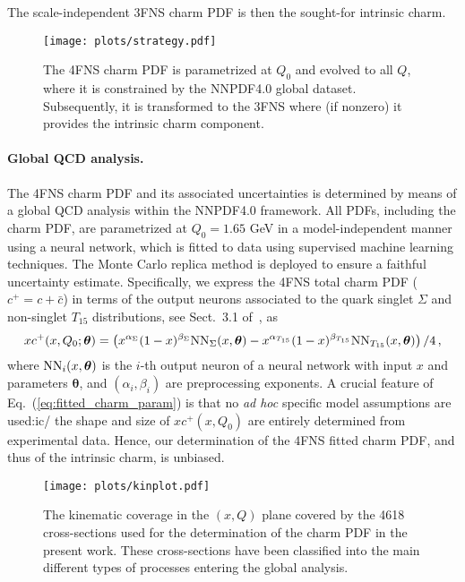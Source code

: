 \documentclass[11pt,a4paper]{article}
\newcommand{\be}{\begin{equation}}
\newcommand{\ee}{\end{equation}}
\newcommand{\lp}{\left(}
\newcommand{\rp}{\right)}
\begin{document}
The scale-independent 3FNS charm PDF is then the sought-for intrinsic
charm.

\begin{figure}[h]
\begin{center}
  \texttt{[image: plots/strategy.pdf]}
 \end{center}
\vspace{-0.2cm}
\caption{The 4FNS charm PDF is parametrized  at $Q_0$
  and evolved to all  $Q$, where it is  constrained by the NNPDF4.0
  global dataset. 
 Subsequently, it is transformed to the 3FNS where (if nonzero) it
 provides the intrinsic charm component.
  \label{fig:ic/strategy}
}
\end{figure}

\paragraph{Global QCD analysis.}
%
The 4FNS charm PDF and its associated
uncertainties is determined by means of a global QCD analysis
within the NNPDF4.0 framework.
%
All PDFs, including the charm PDF, are  parametrized at $Q_0=1.65$ GeV in 
a model-independent manner using a neural network, which is fitted to data using 
supervised machine learning techniques.
The Monte Carlo replica method
is deployed to ensure a faithful uncertainty estimate.
%
Specifically, we express the 4FNS total charm PDF ($c^+=c+\bar{c}$)  in terms of the output neurons associated to the quark singlet $\Sigma$ and non-singlet $T_{15}$
distributions, see Sect.~3.1 of~\cite{Ball:2021leu}, as
\be
\label{eq:ic/fitted_charm_param}
xc^+(x,Q_0;{\boldsymbol \theta}) =
\lp x^{\alpha_{\Sigma}}(1-x)^{\beta_{\Sigma}} {\rm NN}_{\Sigma}(x,{\boldsymbol \theta})-
x^{\alpha_{T_{15}}}(1-x)^{\beta_{T_{15}}} {\rm NN}_{T_{15}}(x,{\boldsymbol \theta})
\rp/4 \, ,
\ee
where ${\rm
  NN}_{i}(x,{\boldsymbol \theta})$ is the $i$-th output neuron of a
neural network with input $x$ and  parameters ${\boldsymbol \theta}$,
and 
$\lp \alpha_i,\beta_i\rp $ are
preprocessing exponents.
%
A crucial feature of Eq.~(\ref{eq:fitted_charm_param}) is that no {\it ad hoc} specific model assumptions are used:ic/ the shape and size of $xc^+(x,Q_0)$ are entirely determined from experimental data.
%
Hence, our determination of the 4FNS fitted charm PDF, and thus of the intrinsic charm, is unbiased.
%

\begin{figure}[t]
\begin{center}
  \texttt{[image: plots/kinplot.pdf]}
 \end{center}
\vspace{-0.8cm}
\caption{The kinematic coverage in the $(x,Q)$ plane
  covered by the 4618 cross-sections used for the
  determination of the charm PDF in the present work.
  These cross-sections have been classified into the main different
  types of processes entering the global analysis.
  \label{fig:ic/kinplot}
}
\end{figure}
\end{document}
